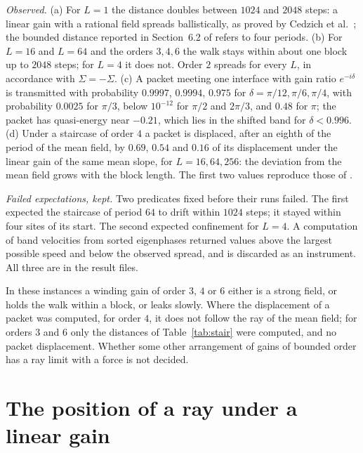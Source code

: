 \emph{Observed.} (a) For $L=1$ the distance doubles between $1024$ and $2048$ steps: a linear gain with a rational field spreads ballistically, as proved by Cedzich et al.\ \cite{cedzich}; the bounded distance reported in Section~6.2 of \cite{g9} refers to four periods. (b) For $L=16$ and $L=64$ and the orders $3,4,6$ the walk stays within about one block up to $2048$ steps; for $L=4$ it does not. Order $2$ spreads for every $L$, in accordance with $\Sigma=-\Sigma$. (c) A packet meeting one interface with gain ratio $e^{-i\delta}$ is transmitted with probability $0.9997$, $0.9994$, $0.975$ for $\delta=\pi/12,\pi/6,\pi/4$, with probability $0.0025$ for $\pi/3$, below $10^{-12}$ for $\pi/2$ and $2\pi/3$, and $0.48$ for $\pi$; the packet has quasi-energy near $-0.21$, which lies in the shifted band for $\delta<0.996$. (d) Under a staircase of order $4$ a packet is displaced, after an eighth of the period of the mean field, by $0.69$, $0.54$ and $0.16$ of its displacement under the linear gain of the same mean slope, for $L=16,64,256$: the deviation from the mean field grows with the block length. The first two values reproduce those of \cite{g9}.

\emph{Failed expectations, kept.} Two predicates fixed before their runs failed. The first expected the staircase of period $64$ to drift within $1024$ steps; it stayed within four sites of its start. The second expected confinement for $L=4$. A computation of band velocities from sorted eigenphases returned values above the largest possible speed and below the observed spread, and is discarded as an instrument. All three are in the result files.

In these instances a winding gain of order $3$, $4$ or $6$ either is a strong field, or holds the walk within a block, or leaks slowly. Where the displacement of a packet was computed, for order $4$, it does not follow the ray of the mean field; for orders $3$ and $6$ only the distances of Table~\ref{tab:stair} were computed, and no packet displacement. Whether some other arrangement of gains of bounded order has a ray limit with a force is not decided.

\section{The position of a ray under a linear gain}\label{sec:ray}

